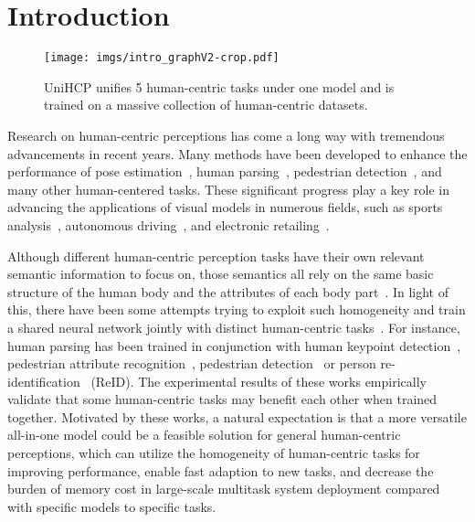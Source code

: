 \documentclass[10pt,twocolumn,letterpaper]{article}
\begin{document}
\section{Introduction}
\label{sec:intro}


\begin{figure}[t]
\centering
\texttt{[image: imgs/intro\_graphV2-crop.pdf]}
\caption{UniHCP unifies 5 human-centric tasks under one model and is trained on a massive collection of human-centric datasets.}
\label{fig:intro}
\end{figure}
Research on human-centric perceptions has come a long way with tremendous advancements in recent years. Many methods have been developed to enhance the performance of pose estimation~\cite{munea2020progress}, human parsing~\cite{liang2018look}, pedestrian detection~\cite{cao2021handcrafted}, and many other human-centered tasks. These significant progress play a key role in advancing the applications of visual models in numerous fields, such as sports analysis~\cite{cust2019machine}, autonomous driving~\cite{zhang2019widerperson}, and electronic retailing~\cite{kalantidis2013getting}.

Although different human-centric perception tasks have their own relevant semantic information to focus on, those semantics all rely on the same basic structure of the human body and the attributes of each body part~\cite{park2017attribute, wang2020hierarchical}. In light of this, there have been some attempts trying to exploit such homogeneity and train a shared neural network jointly with distinct human-centric tasks~\cite{su2017multi, khamis2014joint, liang2018look, tian2015pedestrian, zhang2019pose2seg, nie2018mutual,xu2022fashionformer,lin2018multi,kalayeh2018human}. For instance, human parsing has been trained in conjunction with human keypoint detection~\cite{liang2018look, zhang2019pose2seg, nie2018mutual}, pedestrian attribute recognition~\cite{xu2022fashionformer}, pedestrian detection~\cite{lin2018multi} or person re-identification~\cite{kalayeh2018human} (ReID).
The experimental results of these works empirically validate that some human-centric tasks may benefit each other when trained together.
Motivated by these works, a natural expectation is that a more versatile all-in-one model could be a feasible solution for general human-centric perceptions, which can utilize the homogeneity of human-centric tasks for improving performance, enable fast adaption to new tasks, and decrease the burden of memory cost in large-scale multitask system deployment compared with specific models to specific tasks.
\end{document}
